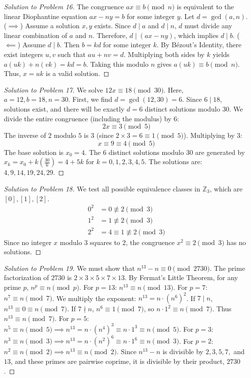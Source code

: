 \documentclass[11pt, a4paper]{article}
\theoremstyle{definition}
\theoremstyle{remark}
\newcommand{\Z}{\mathbb{Z}}
\begin{document}
\begin{proof}[Solution to Problem 16]
The congruence $ax \equiv b \pmod n$ is equivalent to the linear Diophantine equation $ax - ny = b$ for some integer $y$.
Let $d = \gcd(a,n)$. 
($\implies$) Assume a solution $x, y$ exists. Since $d \mid a$ and $d \mid n$, $d$ must divide any linear combination of $a$ and $n$. Therefore, $d \mid (ax - ny)$, which implies $d \mid b$.
($\impliedby$) Assume $d \mid b$. Then $b = kd$ for some integer $k$. By Bézout's Identity, there exist integers $u, v$ such that $au + nv = d$. Multiplying both sides by $k$ yields $a(uk) + n(vk) = kd = b$. Taking this modulo $n$ gives $a(uk) \equiv b \pmod n$. Thus, $x = uk$ is a valid solution.
\end{proof}

\begin{proof}[Solution to Problem 17]
We solve $12x \equiv 18 \pmod{30}$. Here, $a=12, b=18, n=30$. 
First, we find $d = \gcd(12, 30) = 6$. Since $6 \mid 18$, solutions exist, and there will be exactly $d = 6$ distinct solutions modulo $30$.
We divide the entire congruence (including the modulus) by $6$:
\[ 2x \equiv 3 \pmod 5 \]
The inverse of $2$ modulo $5$ is $3$ (since $2 \times 3 = 6 \equiv 1 \pmod 5$). Multiplying by $3$:
\[ x \equiv 9 \equiv 4 \pmod 5 \]
The base solution is $x_0 = 4$. The $6$ distinct solutions modulo $30$ are generated by $x_k = x_0 + k\left(\frac{30}{6}\right) = 4 + 5k$ for $k = 0, 1, 2, 3, 4, 5$.
The solutions are: $4, 9, 14, 19, 24, 29$.
\end{proof}

\begin{proof}[Solution to Problem 18]
We test all possible equivalence classes in $\Z_3$, which are $[0], [1], [2]$.
\begin{align*}
0^2 &= 0 \not\equiv 2 \pmod 3 \\
1^2 &= 1 \not\equiv 2 \pmod 3 \\
2^2 &= 4 \equiv 1 \not\equiv 2 \pmod 3
\end{align*}
Since no integer $x$ modulo $3$ squares to $2$, the congruence $x^2 \equiv 2 \pmod 3$ has no solutions.
\end{proof}

\begin{proof}[Solution to Problem 19]
We must show that $n^{13} - n \equiv 0 \pmod{2730}$. The prime factorization of $2730$ is $2 \times 3 \times 5 \times 7 \times 13$.
By Fermat's Little Theorem, for any prime $p$, $n^p \equiv n \pmod p$.
For $p=13$: $n^{13} \equiv n \pmod{13}$.
For $p=7$: $n^7 \equiv n \pmod 7$. We multiply the exponent: $n^{13} = n \cdot (n^6)^2$. If $7 \mid n$, $n^{13} \equiv 0 \equiv n \pmod 7$. If $7 \nmid n$, $n^6 \equiv 1 \pmod 7$, so $n \cdot 1^2 \equiv n \pmod 7$. Thus $n^{13} \equiv n \pmod 7$.
For $p=5$: $n^5 \equiv n \pmod 5 \implies n^{13} = n \cdot (n^4)^3 \equiv n \cdot 1^3 \equiv n \pmod 5$.
For $p=3$: $n^3 \equiv n \pmod 3 \implies n^{13} = n \cdot (n^2)^6 \equiv n \cdot 1^6 \equiv n \pmod 3$.
For $p=2$: $n^2 \equiv n \pmod 2 \implies n^{13} \equiv n \pmod 2$.
Since $n^{13} - n$ is divisible by $2, 3, 5, 7,$ and $13$, and these primes are pairwise coprime, it is divisible by their product, $2730$.
\end{proof}
\end{document}

